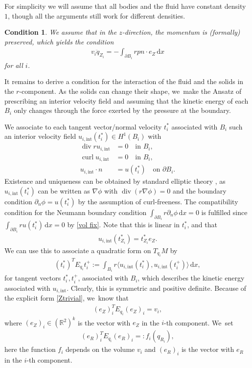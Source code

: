 \documentclass[JEP,XML,SOM,Unicode,published]{cedram}
\newtheorem{condition}[theorem]{Condition}
\theoremstyle{definition}
\renewcommand{\div}{\operatorname{div}}
\DeclareMathOperator{\curl}{curl}
\newcommand\R{\mathbb{R}}
\newcommand\scalar[2]{\langle #1,#2\rangle}
\newcommand\eq{=}
\newcommand\dd{\,\mathrm{d}}
\newcommand\dx{\dd x}
\let\de\partial
\begin{document}
For simplicity we will assume that all bodies and the fluid have constant density~$1$, though all the arguments still work for different densities.

\begin{condition} We assume that in the $z$-direction, the momentum is (formally) preserved, which yields the condition
\begin{align}
v_i\ddot{q}_{{Z}_i}\eq-\int_{\de B_i}rpn\cdot e_Z\dx\label{eq z}
\end{align}
for all $i$.
\end{condition}

It remains to derive a condition for the interaction of the fluid and the solids in the $r$-component. As the solids can change their shape, we~make the Ansatz of prescribing an interior velocity field and assuming that the kinetic energy of each $B_i$ only changes through the force exerted by the pressure at the boundary.

We associate to each tangent vector/normal velocity $t_i^*$ associated with $B_i$ such an interior velocity field $u_{i,\mathrm{int}}(t_i^*)\in H^1(B_i)$ with
\begin{align}
\div ru_{i,\mathrm{int}}&\eq0 \quad\text{in $B_i$},\label{Int1}\\
\curl u_{i,\mathrm{int}}&\eq0 \quad\text{in $B_i$},\label{Int2}\\
u_{i,\mathrm{int}}\cdot n&\eq u(t_i^*)\quad\text{on $\de B_i$.}\label{Int3}
\end{align}
Existence and uniqueness can be obtained by standard elliptic theory \cite[Chap.\,6]{evans2022partial}, as~$u_{i,\mathrm{int}}(t_i^*)$ can be written as $\nabla \phi$ with $\div(r\nabla \phi)=0$ and the boundary condition $\de_n \phi=u(t_i^*)$ by the assumption of curl-freeness. The compatibility condition for the Neumann boundary condition $\int_{\de B_i} r\de_n \phi\dx=0$ is fulfilled since $\int_{\de B_i} r u(t_i^*)\dx=0$ by \eqref{vol fix}.
Note that this is linear in $t_i^*$, and that
\begin{align}\label{Ztrivial}u_{i,\mathrm{int}}(t_{Z_i}^*)=t_{Z_i}^*e_Z.
\end{align}
We can use this to associate a quadratic form on $T_{q_i}M$ by
\begin{align}
(t_i^*)^TE_{q_i}t_i^+:=\int_{B_i}r\scalar{u_{i,\mathrm{int}}(t_i^*)}{u_{i,\mathrm{int}}(t_i^+)}\dx, \label{def E}
\end{align}
for tangent vectors $t_i^*,t_i^+$, associated with $B_i$, which describes the kinetic energy associated with $u_{i,\mathrm{int}}$. Clearly, this is symmetric and positive definite. Because of the explicit form \eqref{Ztrivial}, we~know that
\begin{align*}
(e_Z)_i^TE_{q_i}(e_Z)_i\eq v_i,
\end{align*}
where $(e_Z)_i\in (\R^2)^k$ is the vector with $e_Z$ in the $i$-th component. We~set
\begin{align}
(e_R)_i^TE_{q_i}(e_R)_i=: f_i(q_{R_i})\label{def f},
\end{align}
here the function $f_i$ depends on the volume $v_i$ and $(e_R)_i$ is the vector with $e_R$ in the $i$-th component.
\end{document}
